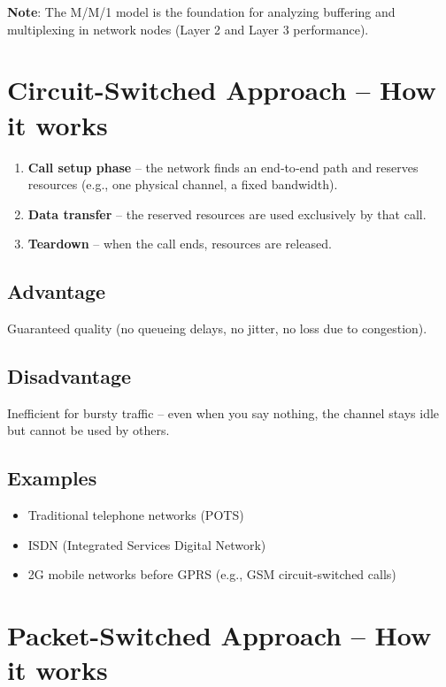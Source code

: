\noindent
\textbf{Note}: The M/M/1 model is the foundation for analyzing buffering and multiplexing in network nodes (Layer 2 and Layer 3 performance).

\section{Circuit-Switched Approach – How it works}

\begin{enumerate}[label=\textbf{Step \arabic*}:]
    \item \textbf{Call setup phase} – the network finds an end‑to‑end path and reserves resources (e.g., one physical channel, a fixed bandwidth).
    \item \textbf{Data transfer} – the reserved resources are used exclusively by that call.
    \item \textbf{Teardown} – when the call ends, resources are released.
\end{enumerate}

\subsection*{Advantage}
Guaranteed quality (no queueing delays, no jitter, no loss due to congestion).

\subsection*{Disadvantage}
Inefficient for bursty traffic – even when you say nothing, the channel stays idle but cannot be used by others.

\subsection*{Examples}
\begin{itemize}
    \item Traditional telephone networks (POTS)
    \item ISDN (Integrated Services Digital Network)
    \item 2G mobile networks before GPRS (e.g., GSM circuit-switched calls)
\end{itemize}

\bigskip

\section{Packet-Switched Approach – How it works}

